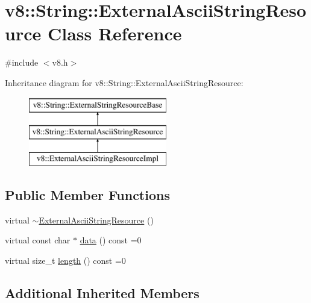 \hypertarget{classv8_1_1_string_1_1_external_ascii_string_resource}{}\section{v8\+:\+:String\+:\+:External\+Ascii\+String\+Resource Class Reference}
\label{classv8_1_1_string_1_1_external_ascii_string_resource}


{\ttfamily \#include $<$v8.\+h$>$}

Inheritance diagram for v8\+:\+:String\+:\+:External\+Ascii\+String\+Resource\+:\begin{figure}[H]
\begin{center}
\leavevmode
\includegraphics[height=3.000000cm]{classv8_1_1_string_1_1_external_ascii_string_resource}
\end{center}
\end{figure}
\subsection*{Public Member Functions}
\begin{DoxyCompactItemize}
\item 
virtual \hyperlink{classv8_1_1_string_1_1_external_ascii_string_resource_acd8790ae14be1b90794b363d24a147d0}{$\sim$\+External\+Ascii\+String\+Resource} ()
\item 
virtual const char $\ast$ \hyperlink{classv8_1_1_string_1_1_external_ascii_string_resource_adeb99e8c8c630e2dac5ad76476249d2f}{data} () const =0
\item 
virtual size\+\_\+t \hyperlink{classv8_1_1_string_1_1_external_ascii_string_resource_aeecccc52434c2057d3dc5c9732458a8e}{length} () const =0
\end{DoxyCompactItemize}
\subsection*{Additional Inherited Members}


